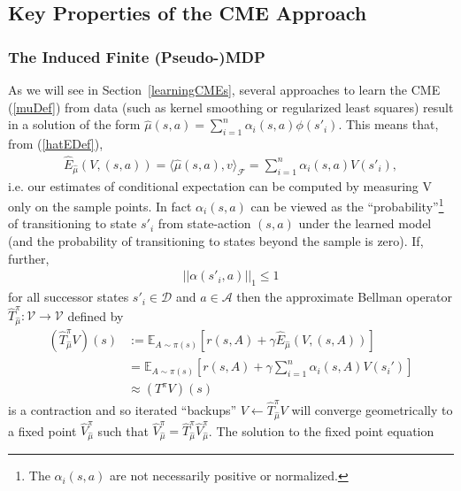 \documentclass[letterpaper]{article}
\newcommand{\cD}{{\mathcal D}}
\newcommand{\cF}{{\mathcal F}}
\newcommand{\cA}{{\mathcal A}}
\newcommand{\cV}{{\mathcal V}}
\newcommand{\E}{{\mathbb E}}
\newcommand{\lang}{\langle}
\newcommand{\rang}{\rangle}
\newcommand{\nn}{\nonumber}
\begin{document}

\subsection{Key Properties of the CME Approach}

\subsubsection{The Induced Finite (Pseudo-)MDP} \label{InducedMDP}

As we will see in Section~\ref{learningCMEs}, several approaches to learn the CME (\ref{muDef}) from data (such as kernel smoothing or regularized least squares) result in a solution of the form $\hat \mu(s,a) = \sum_{i=1}^n \alpha_i(s,a) \phi(s'_i)$. This means that, from (\ref{hatEDef}),
\begin{align}
\hat E_{\hat\mu}(V,(s,a)) = \lang \hat \mu(s,a) , v \rang_\cF =\sum_{i=1}^n \alpha_i(s,a) V(s'_i), \label{finiteExpansion}
\end{align}
i.e. our estimates of conditional expectation can be computed by measuring V only on the sample points. In fact $\alpha_i(s,a)$ can be viewed as the ``probability''\footnote{The $\alpha_i(s,a)$ are not necessarily positive or normalized.} of transitioning to state $s'_i$ from state-action $(s,a)$ under the learned model (and the probability of transitioning to states beyond the sample is zero). If, further,
\begin{align}
||\alpha(s'_i,a)||_1 \le 1 \label{L1Constraint}
\end{align}
for all successor states $s'_i\in\cD$ and $a\in\cA$ then the approximate Bellman operator $\hat T^\pi_{\hat \mu}:\cV\to\cV$ defined by
\begin{align}
(\hat T^\pi_{\hat \mu}V)(s)&:=  \E_{A\sim\pi(s)} [ r(s,A) + \gamma \hat E_{\hat \mu}(V, (s,A))] \nn\\
&= \E_{A\sim\pi(s)} [ r(s,A) + \gamma \sum_{i=1}^n \alpha_i(s,A)V(s_i') ] \label{approxBellman}\\
&\approx (T^\pi V)(s)\nn
\end{align}
is a contraction and so iterated ``backups'' $V\leftarrow \hat T^\pi_{\hat \mu}V$ will converge geometrically to a fixed point $\hat V_{\hat \mu}^{\pi}$ such that $\hat V_{\hat \mu}^{\pi} = \hat T^\pi_{\hat \mu} \hat V_{\hat \mu}^{\pi}$. The solution to the fixed point equation
\end{document}
